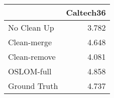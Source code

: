 \begin{tabular}{lr}
\toprule
{} & Caltech36 \\
\midrule
No Clean Up  &     3.782 \\
Clean-merge  &     4.648 \\
Clean-remove &     4.081 \\
OSLOM-full   &     4.858 \\
Ground Truth &     4.737 \\
\bottomrule
\end{tabular}
